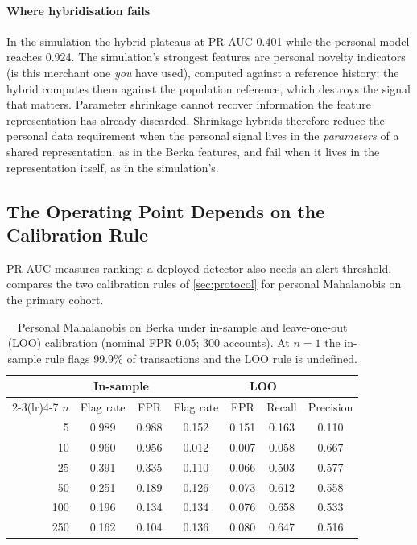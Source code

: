\paragraph{Where hybridisation fails}
In the simulation the hybrid plateaus at PR-AUC 0.401 while the personal model reaches 0.924. The simulation's strongest features are personal novelty indicators (is this merchant one \emph{you} have used), computed against a reference history; the hybrid computes them against the population reference, which destroys the signal that matters. Parameter shrinkage cannot recover information the feature representation has already discarded. Shrinkage hybrids therefore reduce the personal data requirement when the personal signal lives in the \emph{parameters} of a shared representation, as in the Berka features, and fail when it lives in the representation itself, as in the simulation's.

\subsection{The Operating Point Depends on the Calibration Rule}\label{sec:calibration}

PR-AUC measures ranking; a deployed detector also needs an alert threshold.  compares the two calibration rules of \cref{sec:protocol} for personal Mahalanobis on the primary cohort.

\begin{table}[!t]
\caption{Personal Mahalanobis on Berka under in-sample and leave-one-out (LOO) calibration (nominal FPR 0.05; 300 accounts). At $n=1$ the in-sample rule flags 99.9\% of transactions and the LOO rule is undefined.}
\label{tab:calib}
\centering\footnotesize\setlength{\tabcolsep}{2.8pt}
\begin{tabular}{r cc cccc}
\toprule
& \multicolumn{2}{c}{In-sample} & \multicolumn{4}{c}{LOO} \\
\cmidrule(lr){2-3}\cmidrule(lr){4-7}
$n$ & Flag rate & FPR & Flag rate & FPR & Recall & Precision \\
\midrule
5   & 0.989 & 0.988 & 0.152 & 0.151 & 0.163 & 0.110 \\
10  & 0.960 & 0.956 & 0.012 & 0.007 & 0.058 & 0.667 \\
25  & 0.391 & 0.335 & 0.110 & 0.066 & 0.503 & 0.577 \\
50  & 0.251 & 0.189 & 0.126 & 0.073 & 0.612 & 0.558 \\
100 & 0.196 & 0.134 & 0.134 & 0.076 & 0.658 & 0.533 \\
250 & 0.162 & 0.104 & 0.136 & 0.080 & 0.647 & 0.516 \\
\bottomrule
\end{tabular}
\end{table}

